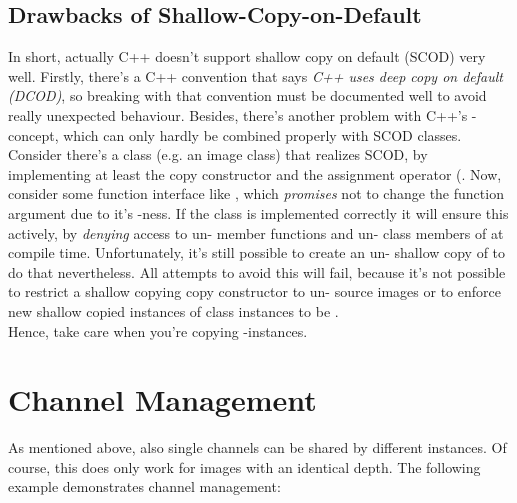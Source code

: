 
\subsection{Drawbacks of Shallow-Copy-on-Default}
In short, actually C++ doesn't support shallow copy on default (SCOD) very well. Firstly, there's a C++ convention that says \emph{C++ uses deep copy on default (DCOD)}, so breaking with that convention must be documented well to avoid really unexpected behaviour. Besides, there's another problem with C++'s -concept, which can only hardly be combined properly with SCOD classes. Consider there's a class  (e.g. an image class) that realizes SCOD, by implementing at least the copy constructor  and the assignment operator (. Now, consider some function interface like , which \emph{promises} not to change the function argument  due to it's -ness. If the class  is implemented correctly it will ensure this actively, by \emph{denying} access to un- member functions and un- class members of  at compile time. Unfortunately, it's still possible to create an un- shallow copy of  to do that nevertheless. All attempts to avoid this will fail, because it's not possible to restrict a shallow copying copy constructor to un- source images or to enforce new shallow copied instances of  class instances to be .\\
Hence, take care when you're copying -instances.



\section {Channel Management}

As mentioned above, also single channels can be shared by different  instances. Of course, this does only work for images with an identical depth. The following example demonstrates channel management:





